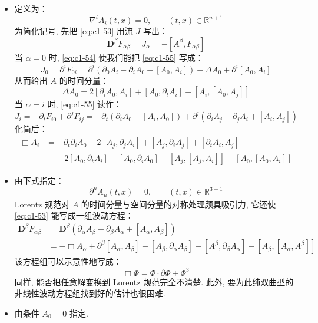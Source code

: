 \begin{itemize}
\item {}定义为：
\begin{equation}
\nabla^iA_i(t, x) = 0, \qquad (t, x) \in \mathbb{R}^{n+1}\label{eq:c1-54}
\end{equation}
为简化记号, 先把 \eqref{eq:c1-53} 用流 $J$ 写出：
\begin{equation}
\mathbf{D}^\beta F_{\alpha\beta} = J_\alpha = -\left[A^\beta, F_{\alpha\beta}\right]\label{eq:c1-55}
\end{equation}
当 $\alpha = 0$ 时, \eqref{eq:c1-54} 使我们能把 \eqref{eq:c1-55} 写成：
\[
J_0 = \partial^iF_{0i} = \partial^i(\partial_0A_i - \partial_iA_0 + [A_0, A_i]) - \Delta A_0 + \partial^i[A_0, A_i]
\]
从而给出 $A$ 的时间分量：
\begin{equation}
\Delta A_0 = 2[\partial_iA_0, A_i] + [A_0, \partial_tA_i] + [A_i, [A_0, A_j]]\label{eq:c1-56}
\end{equation}
当 $\alpha = i$ 时, \eqref{eq:c1-55} 读作：
\[
J_i = -\partial_tF_{i0} + \partial^jF_{ij} = -\partial_t(\partial_iA_0 + [A_i, A_0]) + \partial^j(\partial_iA_j - \partial_jA_i + [A_i, A_j])
\]
化简后：
\begin{equation}
\begin{aligned}
\Box A_i &= -\partial_t\partial_iA_0 - 2[A_j, \partial_jA_i] + [A_j, \partial_iA_j] + [\partial_tA_i, A_j]\\
&\quad + 2[A_0, \partial_tA_i] - [A_0, \partial_iA_0] - [A_j, [A_j, A_i]] + [A_0, [A_0, A_i]]
\end{aligned}\label{eq:c1-57}
\end{equation}

\item {}由下式指定：
\begin{equation}
\partial^\mu A_\mu(t, x) = 0, \qquad (t, x) \in \mathbb{R}^{3+1}\label{eq:c1-58}
\end{equation}
Lorentz 规范对 $A$ 的时间分量与空间分量的对称处理颇具吸引力, 它还使 \eqref{eq:c1-53} 能写成一组波动方程：
\[
\begin{aligned}
\mathbf{D}^\beta F_{\alpha\beta} &= \mathbf{D}^\beta(\partial_\alpha A_\beta - \partial_\beta A_\alpha + [A_\alpha, A_\beta])\\
&= -\Box A_\alpha + \partial^\beta[A_\alpha, A_\beta] + [A_\beta, \partial_\alpha A_\beta] - [A^\beta, \partial_\beta A_\alpha] + [A_\beta, [A_\alpha, A^\beta]]
\end{aligned}
\]
该方程组可以示意性地写成：
\[
\Box\Phi = \Phi\cdot\partial\Phi + \Phi^3
\]
同样, 能否把任意解变换到 Lorentz 规范完全不清楚. 此外, 要为此纯双曲型的非线性波动方程组找到好的估计也很困难. 

\item {}由条件 $A_0 = 0$ 指定. 
\end{itemize}

